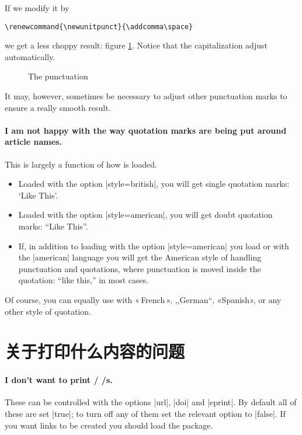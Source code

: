 If we modify it by
\begin{Verbatim}
\renewcommand{\newunitpunct}{\addcomma\space}
\end{Verbatim}
we get a less choppy result: figure \ref{punctcite11}. Notice that the
capitalization adjust automatically.\begin{figure}
\caption{The  punctuation\label{punctcite11}}
\end{figure} It may, however, sometimes be necessary to adjust other
punctuation marks to ensure a really smooth result.

\paragraph{I am not happy with the way quotation marks are being put
  around article names.} This is largely a function of how
 is loaded.
\begin{itemize}
\item Loaded with the option |style=british|, you will get single
   quotation marks: `Like This'.
\item Loaded with the option |style=american|, you will get doubt
   quotation marks: ``Like This''.
\item If, in addition to loading  with the option
   |style=american| you load  or  with the
   |american| language you will get the American style of handling punctuation
   and quotations, where punctuation is moved inside the quotation:
   ``like this,'' in most cases.
\end{itemize}
Of course, you can equally use  with «\,French\,»,
,,German``, «Spanish», or any other style of quotation.


\section{关于打印什么内容的问题}

\paragraph{I don't want to print \slash
  \slash {}s.} These can be controlled
with the options |url|, |doi| and |eprint|. By default all of these
are set |true|; to turn off any of them set the relevant option to
|false|. If you want links to be created you should load the
 package.

